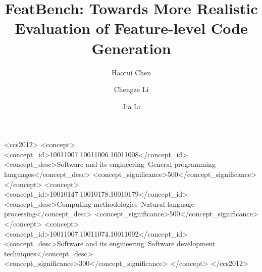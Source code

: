 \documentclass[screen, manuscript]{acmart}
\begin{document}
\title{FeatBench: Towards More Realistic Evaluation of Feature-level Code Generation}

\author{Haorui Chen}

\author{Chengze Li}

\author{Jia Li}

\renewcommand{\shortauthors}{Chen et al.}


\begin{CCSXML}
<ccs2012>
   <concept>
       <concept_id>10011007.10011006.10011008</concept_id>
       <concept_desc>Software and its engineering~General programming languages</concept_desc>
       <concept_significance>500</concept_significance>
       </concept>
   <concept>
       <concept_id>10010147.10010178.10010179</concept_id>
       <concept_desc>Computing methodologies~Natural language processing</concept_desc>
       <concept_significance>500</concept_significance>
       </concept>
   <concept>
       <concept_id>10011007.10011074.10011092</concept_id>
       <concept_desc>Software and its engineering~Software development techniques</concept_desc>
       <concept_significance>300</concept_significance>
       </concept>
 </ccs2012>
\end{CCSXML}
\end{document}
